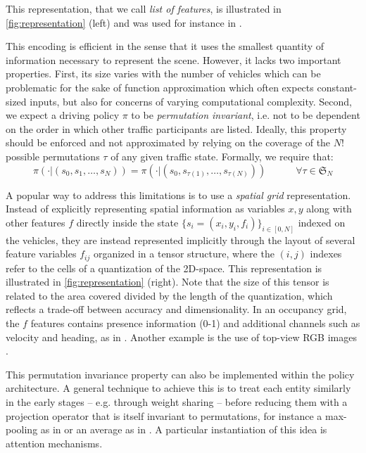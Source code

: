 \documentclass{article}
\begin{document}
{This representation, that we call \emph{list of features}, is illustrated in \autoref{fig:representation} (left) and was used for instance in \citep{Bai2015, Gindele2015, Song2016, Sunberg2017, Paxton2017, Galceran2017, Chen2017}.


This encoding is efficient in the sense that it uses the smallest quantity of information necessary to represent the scene. However, it lacks two important properties. First, its size varies with the number of vehicles which can be problematic for the sake of function approximation which often expects constant-sized inputs, but also for concerns of varying computational complexity. Second, we expect a driving policy $\pi$ to be \emph{permutation invariant}, i.e. not to be dependent on the order in which other traffic participants are listed. Ideally, this property should be enforced and not approximated by relying on the coverage of the $N!$ possible permutations $\tau$ of any given traffic state. Formally, we require that:
\begin{equation*}
\pi(\cdot|(s_0, s_1,\dotsc,s_N)) = \pi(\cdot|(s_0, s_{\tau(1)},\dotsc,s_{\tau(N)})) \quad\quad\quad \forall\tau \in \mathfrak{S}_N
\end{equation*}

A popular way to address this limitations is to use a \emph{spatial grid} representation. Instead of explicitly representing spatial information as variables $x, y$ along with other features $f$ directly inside the state $\{s_i=(x_i,y_i,f_i)\}_{i\in[0,N]}$ indexed on the vehicles, they are instead represented implicitly through the layout of several feature variables $f_{ij}$ organized in a tensor structure, where the $(i,j)$ indexes refer to the cells of a quantization of the 2D-space. This representation is illustrated in \autoref{fig:representation} (right). Note that the size of this tensor is related to the area covered divided by the length of the quantization, which reflects a trade-off between accuracy and dimensionality.
In an occupancy grid, the $f$ features contains presence information (0-1) and additional channels such as velocity and heading, as in \citep[e.g.][]{Isele2017, Fridman2018, Bansal2018, Rehder2017c}. Another example is the use of top-view RGB images \citep[e.g.][]{Bagnell2010, Rehder2017, Rehder2017c, Liu2018}.


This permutation invariance property can also be implemented within the policy architecture. A general technique to achieve this is to treat each entity similarly in the early stages -- e.g. through weight sharing -- before reducing them with a projection operator that is itself invariant to permutations, for instance a max-pooling as in \citep{Chen2017} or an average as in \citep{Qi2016}. A particular instantiation of this idea is attention mechanisms.


}
\end{document}
